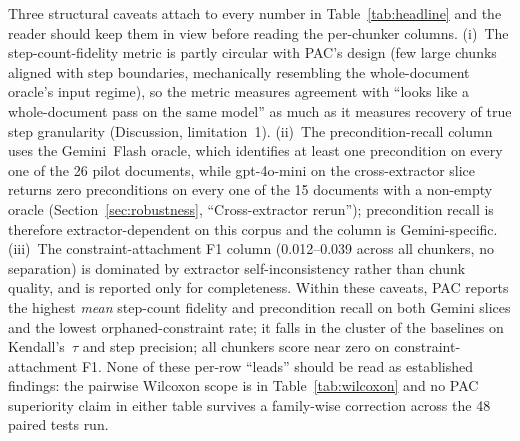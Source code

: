 \documentclass[make,article,submit,oneauthor,pdftex]{Definitions/mdpi}
\begin{document}
Three structural caveats attach to every number in
Table~\ref{tab:headline} and the reader should keep them in view
before reading the per-chunker columns. (i)~The step-count-fidelity
metric is partly circular with PAC's design (few large chunks aligned
with step boundaries, mechanically resembling the whole-document
oracle's input regime), so the metric measures agreement with
``looks like a whole-document pass on the same model'' as much as it
measures recovery of true step granularity (Discussion, limitation~1).
(ii)~The precondition-recall column uses the Gemini~Flash oracle,
which identifies at least one precondition on every one of the 26
pilot documents, while gpt-4o-mini on the cross-extractor slice
returns zero preconditions on every one of the 15 documents with a
non-empty oracle (Section~\ref{sec:robustness}, ``Cross-extractor
rerun''); precondition recall is therefore extractor-dependent on
this corpus and the column is Gemini-specific. (iii)~The
constraint-attachment F1 column (0.012--0.039 across all chunkers,
no separation) is dominated by extractor self-inconsistency rather
than chunk quality, and is reported only for completeness. Within
these caveats, PAC reports the highest \emph{mean} step-count
fidelity and precondition recall on both Gemini slices and the
lowest orphaned-constraint rate; it falls in the cluster of the
baselines on Kendall's~$\tau$ and step precision; all chunkers
score near zero on constraint-attachment F1. None of these per-row
``leads'' should be read as established findings: the pairwise
Wilcoxon scope is in Table~\ref{tab:wilcoxon} and no PAC superiority
claim in either table survives a family-wise correction across the
48 paired tests run.
\end{document}
